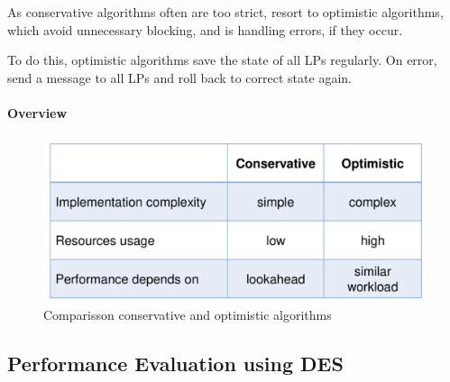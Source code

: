 \documentclass[english]{panikzettel}
\begin{document}
	As conservative algorithms often are too strict, resort to optimistic algorithms, which avoid unnecessary blocking, and is handling errors, if they occur.

	To do this, optimistic algorithms save the state of all LPs regularly.
	On error, send a message to all LPs and roll back to correct state again.

	\paragraph{Overview}
	\label{pgf:synchronization-and-coordination-algorithms:overview}
	
	\begin{figure}[H]
		\centering
		\includegraphics[width=\textwidth]{img/5-cons-vs-opti.png}
		\caption{Comparisson conservative and optimistic algorithms}
		\label{img-5-cons-vs-opti}
	\end{figure}
	
	\subsection{Performance Evaluation using DES}
	\label{ss:discrete-event-simulation:performance-evaluation-using-des}
	
\end{document}
